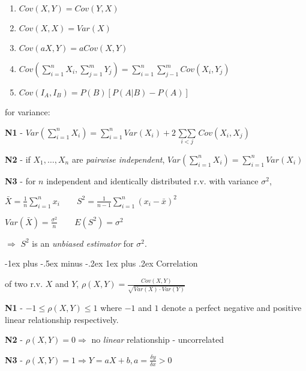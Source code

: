 \documentclass[10pt, landscape]{article}
\makeatletter
\renewcommand{\subsubsection}{\@startsection{subsubsection}{3}{0mm}%
  {-1ex plus -.5ex minus -.2ex}%
  {1ex plus .2ex}%
{\normalfont\small\bfseries}}%
\makeatother
\begin{document}
\begin{multicols*}{3}
    \begin{enumerate}
      \item $Cov(X, Y) = Cov(Y, X)$ 
      \item $Cov(X, X) = Var(X)$ 
      \item $Cov(aX, Y) = aCov(X, Y)$
      \item $Cov (\sum\limits^n_{i=1} X_i, \sum\limits^m_{j=1} Y_j) = \sum\limits^n_{i=1} \sum\limits^m_{j-1} Cov(X_i, Y_j) $
      \item $Cov (I_A, I_B) = P(B) [ P(A \vert B) - P(A) ] $
    \end{enumerate}

    for variance:

    \textbf{N1} - $Var (\sum\limits^n_{i=1} X_i) = \sum\limits^n_{i=1} Var(X_i) + 2 \mathop{\sum\sum}\limits_{i<j} Cov(X_i, X_j) $

    \textbf{N2} - if $X_1, \dots, X_n$ are \textit{pairwise independent}, $Var(\sum\limits^n_{i=1} X_i) = \sum\limits^n_{i=1} Var(X_i)$

    \textbf{N3} - for $n$ independent and identically distributed r.v. with variance  $\sigma^2$, 
    \begin{tightcenter}
      $\bar{X} = \frac{1}{n} \sum\limits^n_{i=1} x_i \quad\quad S^2 = \frac{1}{n-1} \sum\limits^n_{i=1} (x_i - \bar{x})^2$ 

      $Var (\bar{X}) = \frac{\sigma^2}{n} \quad\quad E(S^2) = \sigma^2 \quad\quad\quad\quad$
    \end{tightcenter}
    $\Rightarrow$ $S^2$ is an \textit{unbiased estimator} for $\sigma^2$.

    \subsubsection{Correlation}

    \begin{tightcenter}
       of two r.v. $X$ and $Y$, 
      $\rho(X, Y) = \frac{Cov(X, Y)}{\sqrt{Var(X) \cdot Var(Y)}}$
    \end{tightcenter}

    \textbf{N1} - $-1 \leq \rho(X, Y) \leq 1$
    where  $-1$ and $1$ denote a perfect negative and positive linear relationship respectively.

    \textbf{N2} - $\rho(X, Y) = 0 \Rightarrow$ no \textit{linear} relationship - uncorrelated

    \textbf{N3} - $\rho(X, Y) = 1 \Rightarrow Y = aX + b, a = \frac{\delta y}{\delta x} > 0$


\end{multicols*}
\end{document}
